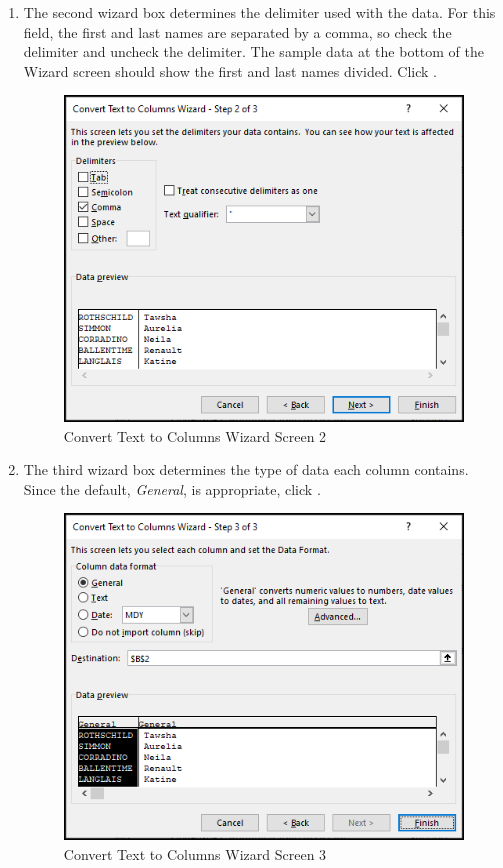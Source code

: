 \begin{enumbox}
\begin{enumerate}
		\item The second wizard box determines the delimiter used with the data. For this field, the first and last names are separated by a comma, so check the  delimiter and uncheck the  delimiter. The sample data at the bottom of the Wizard screen should show the first and last names divided. Click .
	
		\begin{figure}[H]
			\centering
			\includegraphics[width=\maxwidth{.75\linewidth}]{gfx/ch09_fig31}
			\caption{Convert Text to Columns Wizard Screen 2}
			\label{09:fig31}
		\end{figure}
	
		\item The third wizard box determines the type of data each column contains. Since the default, \textit{General}, is appropriate, click .
	
		\begin{figure}[H]
			\centering
			\includegraphics[width=\maxwidth{.75\linewidth}]{gfx/ch09_fig32}
			\caption{Convert Text to Columns Wizard Screen 3}
			\label{09:fig32}
		\end{figure}
	

\end{enumerate}
\end{enumbox}
